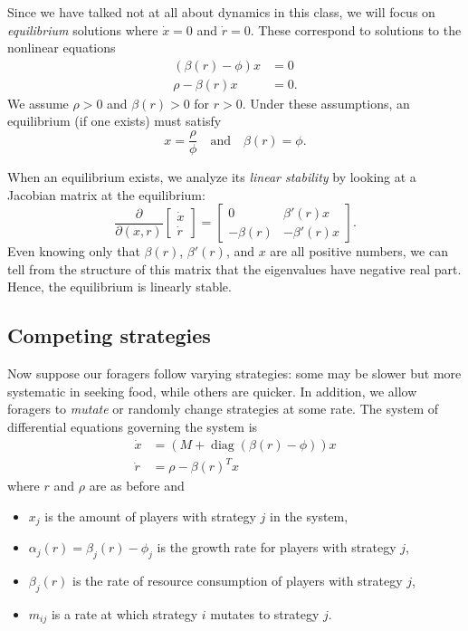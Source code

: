 \documentclass[12pt, leqno]{article} %
\begin{document}
Since we have talked not at all about dynamics in this
class, we will focus on {\em equilibrium} solutions where
$\dot{x} = 0$ and $\dot{r} = 0$.  These correspond to solutions to
the nonlinear equations
\begin{align*}
  (\beta(r)-\phi) x & = 0 \\
  \rho - \beta(r) x & = 0.
\end{align*}
We assume $\rho > 0$ and $\beta(r) > 0$ for $r > 0$.  Under these
assumptions, an equilibrium (if one exists) must satisfy
\[
  x = \frac{\rho}{\phi} \quad \mbox{and} \quad
  \beta(r) = \phi.
\]

When an equilibrium exists, we analyze its {\em linear stability} by
looking at a Jacobian matrix at the equilibrium:
\[
\frac{\partial}{\partial (x,r)}
\begin{bmatrix} \dot{x} \\ \dot{r} \end{bmatrix} =
\begin{bmatrix}
  0 & \beta'(r) x \\
  -\beta(r) & -\beta'(r) x
\end{bmatrix}.
\]
Even knowing only that $\beta(r)$, $\beta'(r)$, and $x$ are all
positive numbers, we can tell from the structure of this matrix that
the eigenvalues have negative real part.  Hence, the equilibrium is
linearly stable.

\subsection{Competing strategies}

Now suppose our foragers follow varying strategies: some may be slower
but more systematic in seeking food, while others are quicker.  In
addition, we allow foragers to {\em mutate} or randomly change
strategies at some rate.  The system of differential equations
governing the system is
\begin{align*}
  \dot{x} &= \left(M + \operatorname{diag}(\beta(r)-\phi)\right)x \\
  \dot{r} &= \rho - \beta(r)^T x
\end{align*}
where $r$ and $\rho$ are as before and
\begin{itemize}
\item $x_j$ is the amount of players with strategy $j$ in the system,
\item $\alpha_j(r) = \beta_j(r)-\phi_j$ is the growth rate for players
  with strategy $j$,
\item $\beta_j(r)$ is the rate of resource consumption of players with
  strategy $j$,
\item $m_{ij}$ is a rate at which strategy $i$ mutates to strategy $j$.
\end{itemize}
\end{document}
